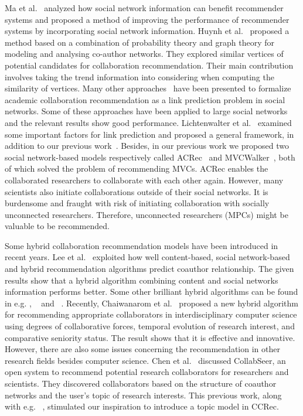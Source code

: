 \documentclass[10pt,letterpaper]{article}
\begin{document}
Ma et al.~\cite{ma2011recommender} analyzed how social network information can benefit recommender systems and proposed a method of improving the performance of recommender systems by incorporating social network information. Huynh et al.~\cite{huynh2013trend} proposed a method based on a combination of probability theory and graph theory for modeling and analysing co-author networks. They explored similar vertices of potential candidates for collaboration recommendation. Their main contribution involves taking the trend information into considering when computing the similarity of vertices. Many other approaches~\cite{chen2012discovering,sun2011co} have been presented to formalize academic collaboration recommendation as a link prediction problem in social networks. Some of these approaches have been applied to large social networks and the relevant results show good performance. Lichtenwalter et al.~\cite{lichtenwalter2010new} examined some important factors for link prediction and proposed a general framework, in addition to our previous work~\cite{li2014acrec,xia2014mvcwalker}. Besides, in our previous work we proposed two social network-based models respectively called ACRec~\cite{li2014acrec} and MVCWalker~\cite{xia2014mvcwalker}, both of which solved the problem of recommending MVCs. ACRec enables the collaborated researchers to collaborate with each other again. However, many scientists also initiate collaborations outside of their social networks. It is burdensome and fraught with risk of initiating collaboration with socially unconnected researchers. Therefore, unconnected researchers (MPCs) might be valuable to be recommended.

Some hybrid collaboration recommendation models have been introduced in recent years. Lee et al.~\cite{lee2011recommending} exploited how well content-based, social network-based and hybrid recommendation algorithms predict coauthor relationship. The given results show that a hybrid algorithm combining content and social networks information performs better. Some other brilliant hybrid algorithms can be found in e.g. \cite{cohen2013recommending}, ~\cite{petertonkoker2014scientific} and ~\cite{xia2014socially}. Recently, Chaiwanarom et al.~\cite{chaiwanarom2014collaborator} proposed a new hybrid algorithm for recommending appropriate collaborators in interdisciplinary computer science using degrees of collaborative forces, temporal evolution of research interest, and comparative seniority status. The result shows that it is effective and innovative. However, there are also some issues concerning the recommendation in other research fields besides computer science. Chen et al.~\cite{chen2011collabseer} discussed CollabSeer, an open system to recommend potential research collaborators for researchers and scientists. They discovered collaborators based on the structure of coauthor networks and the user's topic of research interests. This previous work, along with e.g. ~\cite{li2014author}, stimulated our inspiration to introduce a topic model in CCRec.
\end{document}
